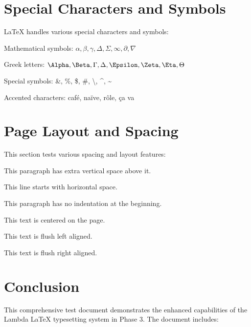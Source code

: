 \documentclass[11pt,letterpaper]{article}
\begin{document}
\section{Special Characters and Symbols}

LaTeX handles various special characters and symbols:

Mathematical symbols: $\alpha, \beta, \gamma, \Delta, \Sigma, \infty, \partial, \nabla$

Greek letters: $\Alpha, \Beta, \Gamma, \Delta, \Epsilon, \Zeta, \Eta, \Theta$

Special symbols: \&, \%, \$, \#, \textbackslash, \textasciicircum, \textasciitilde

Accented characters: caf\'{e}, na\"{i}ve, r\^{o}le, \c{c}a va

\section{Page Layout and Spacing}

This section tests various spacing and layout features:

\vspace{1em}

This paragraph has extra vertical space above it.

\hspace{2em} This line starts with horizontal space.

\noindent This paragraph has no indentation at the beginning.

\begin{center}
This text is centered on the page.
\end{center}

\begin{flushleft}
This text is flush left aligned.
\end{flushleft}

\begin{flushright}
This text is flush right aligned.
\end{flushright}

\section{Conclusion}
\label{sec:conclusion}

This comprehensive test document demonstrates the enhanced capabilities of the Lambda LaTeX typesetting system in Phase 3. The document includes:
\end{document}
